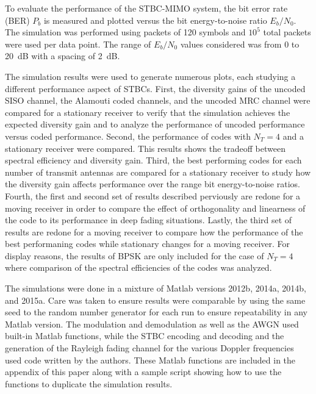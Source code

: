To evaluate the performance of the STBC-MIMO system, the bit error rate (BER) $P_b$ is measured and plotted versus the bit energy-to-noise ratio $E_b/N_0$. The simulation was performed using packets of 120 symbols and $10^5$ total packets were used per data point. The range of $E_b/N_0$ values considered was from 0 to 20~dB with a spacing of 2~dB.

The simulation results were used to generate numerous plots, each studying a different performance aspect of STBCs. First, the diversity gains of the uncoded SISO channel, the Alamouti coded channels, and the uncoded MRC channel were compared for a stationary receiver to verify that the simulation achieves the expected diversity gain and to analyze the performance of uncoded performance versus coded performance. Second, the performance of codes with $N_T=4$ and a stationary receiver were compared. This results shows the tradeoff between spectral efficiency and diversity gain. Third, the best performing codes for each number of transmit antennas are compared for a stationary receiver to study how the diversity gain affects performance over the range bit energy-to-noise ratios. Fourth, the first and second set of results described perviously are redone for a moving receiver in order to compare the effect of orthogonality and linearness of the code to its performance in deep fading situations. Lastly, the third set of results are redone for a moving receiver to compare how the performance of the best performaning codes while stationary changes for a moving receiver. For display reasons, the results of BPSK are only included for the case of $N_T=4$ where comparison of the spectral efficiencies of the codes was analyzed.

The simulations were done in a mixture of Matlab versions 2012b, 2014a, 2014b, and 2015a. Care was taken to ensure results were comparable by using the same seed to the random number generator for each run to ensure repeatability in any Matlab version. The modulation and demodulation as well as the AWGN used built-in Matlab functions, while the STBC encoding and decoding and the generation of the Rayleigh fading channel for the various Doppler frequencies used code written by the authors. These Matlab functions are included in the appendix of this paper along with a sample script showing how to use the functions to duplicate the simulation results.